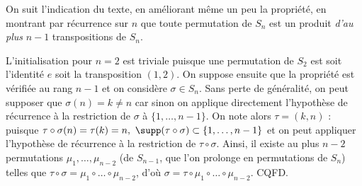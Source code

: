 On suit l'indication du texte, en améliorant même un peu la propriété, en montrant par récurrence sur $n$ que toute permutation de $S_n$ est un produit \emph{d'au plus }$n-1$ transpositions de $S_n$.

L'initialisation pour $n=2$ est triviale puisque une permutation de $S_2$ est soit l'identité $e$ soit la transposition $(1,2)$.
On suppose ensuite que la propriété est vérifiée au rang $n-1$ et on considère $\sigma \in S_n$. Sans perte de généralité, on peut supposer que $\sigma(n) = k\neq n$ car sinon on applique directement l'hypothèse de récurrence à la restriction de $\sigma$ à $\{1, \ldots, n-1\}$. On note alors $\tau = (k,n)$ : puisque $\tau\circ \sigma(n) = \tau(k) = n,~ \supp(\tau\circ \sigma) \subset \{1, \ldots, n-1\}$ et on peut appliquer l'hypothèse de récurrence à la restriction de $\tau\circ \sigma$. Ainsi, il existe au plus $n-2$ permutations $\mu_1,\ldots, \mu_{n-2}$ (de $S_{n-1}$, que l'on prolonge en permutations de $S_n$) telles que $\tau\circ \sigma = \mu_1\circ\ldots\circ \mu_{n-2}$, d'où $\sigma = \tau \circ \mu_1\circ\ldots\circ \mu_{n-2}$. CQFD.


